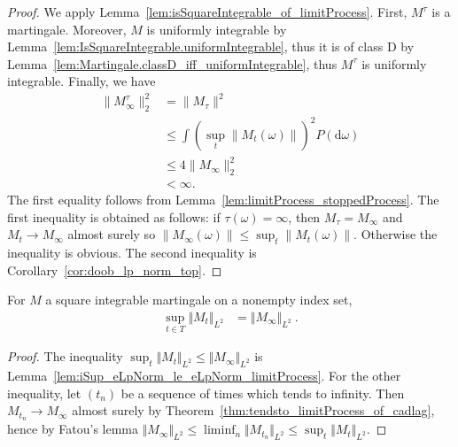 \begin{proof}
  \leanok
We apply Lemma~\ref{lem:isSquareIntegrable_of_limitProcess}. First, $M^\tau$ is a martingale. Moreover, $M$ is uniformly integrable by Lemma~\ref{lem:IsSquareIntegrable.uniformIntegrable}, thus it is of class D by Lemma~\ref{lem:Martingale.classD_iff_uniformIntegrable}, thus $M^\tau$ is uniformly integrable. Finally, we have
\begin{align*}
  \|M^\tau_\infty\|_2^2 & = \|M_\tau\|^2 \\
  & \le \int (\sup_t \|M_t(\omega)\|)^2 P(\mathrm d\omega) \\
  & \le 4 \|M_\infty\|^2_2 \\
  & < \infty.
\end{align*}
The first equality follows from Lemma~\ref{lem:limitProcess_stoppedProcess}. The first inequality is obtained as follows: if $\tau(\omega) = \infty$, then $M_\tau = M_\infty$ and $M_t \longrightarrow M_\infty$ almost surely so $\|M_\infty(\omega)\| \le \sup_t \|M_t(\omega)\|$. Otherwise the inequality is obvious. The second inequality is Corollary~\ref{cor:doob_lp_norm_top}.
\end{proof}


\begin{lemma}\label{lem:IsSquareIntegrable.sup_eLpNorm_eq_eLpNorm_limitProcess}
  \leanok
For $M$ a square integrable martingale on a nonempty index set,
\begin{align*}
  \sup_{t \in T} \Vert M_t \Vert_{L^2}
  &= \Vert M_\infty \Vert_{L^2}
  \: .
\end{align*}
\end{lemma}

\begin{proof}
  \leanok
The inequality $\sup_t \Vert M_t \Vert_{L^2} \le \Vert M_\infty \Vert_{L^2}$ is Lemma~\ref{lem:iSup_eLpNorm_le_eLpNorm_limitProcess}.
For the other inequality, let $(t_n)$ be a sequence of times which tends to infinity.
Then $M_{t_n} \to M_\infty$ almost surely by Theorem~\ref{thm:tendsto_limitProcess_of_cadlag}, hence by Fatou's lemma
$\Vert M_\infty \Vert_{L^2} \le \liminf_n \Vert M_{t_n} \Vert_{L^2} \le \sup_t \Vert M_t \Vert_{L^2}$.
\end{proof}


